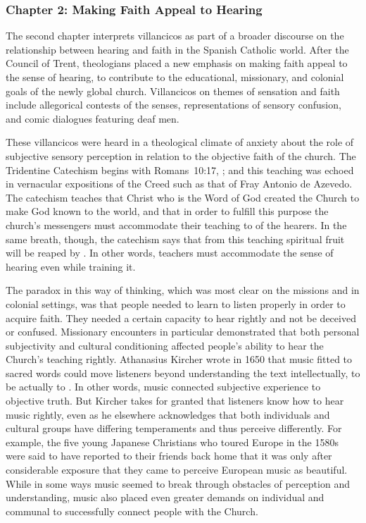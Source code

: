\documentclass[tt]{vcbook-proposal}
\begin{document}
\subsubsection{Chapter 2: Making Faith Appeal to Hearing}

The second chapter interprets villancicos as part of a broader discourse on the relationship between hearing and faith in the Spanish Catholic world.
After the Council of Trent, theologians placed a new emphasis on making faith appeal to the sense of hearing, to contribute to the educational, missionary, and colonial goals of the newly global church.
Villancicos on themes of sensation and faith include allegorical contests of the senses, representations of sensory confusion, and comic dialogues featuring deaf men.

These villancicos were heard in a theological climate of anxiety about the role of subjective sensory perception in relation to the objective faith of the church.
The Tridentine Catechism begins with Romans~10:17, ; and this teaching was echoed in vernacular expositions of the Creed such as that of Fray Antonio de Azevedo.
The catechism teaches that Christ who is the Word of God created the Church to make God known to the world, and that in order to fulfill this purpose the church's messengers must accommodate their teaching to  of the hearers.
In the same breath, though, the catechism says that from this teaching spiritual fruit will be reaped by .
In other words, teachers must accommodate the sense of hearing even while training it.

The paradox in this way of thinking, which was most clear on the missions and in colonial settings, was that people needed to learn to listen properly in order to acquire faith.
They needed a certain capacity to hear rightly and not be deceived or confused.
Missionary encounters in particular demonstrated that both personal subjectivity and cultural conditioning affected people's ability to hear the Church's teaching rightly.
Athanasius Kircher wrote in 1650 that music fitted to sacred words could move listeners beyond understanding the text intellectually, to be actually  to .
In other words, music connected subjective experience to objective truth. 
But Kircher takes for granted that listeners know how to hear music rightly, even as he elsewhere acknowledges that both individuals and cultural groups have differing temperaments and thus perceive differently.
For example, the five young Japanese Christians who toured Europe in the 1580s were said to have reported to their friends back home that it was only after considerable exposure that they came to perceive European music as beautiful.
While in some ways music seemed to break through obstacles of perception and understanding, music also placed even greater demands on individual and communal  to successfully connect people with the Church.
\end{document}
